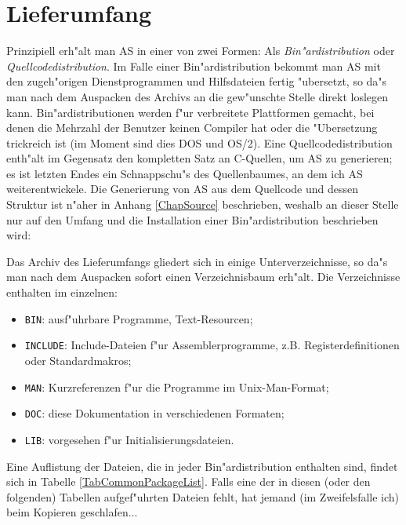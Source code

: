 \documentclass[12pt,a4paper,twoside]{report}
\begin{document}

\section{Lieferumfang}

Prinzipiell erh"alt man AS in einer von zwei Formen: Als {\em
Bin"ardistribution} oder {\em Quellcodedistribution}.  Im Falle einer
Bin"ardistribution bekommt man AS mit den zugeh"origen Dienstprogrammen
und Hilfsdateien fertig "ubersetzt, so da"s man nach dem Auspacken des
Archivs an die gew"unschte Stelle direkt loslegen kann.
Bin"ardistributionen werden f"ur verbreitete Plattformen gemacht, bei
denen die Mehrzahl der Benutzer keinen Compiler hat oder die "Ubersetzung
trickreich ist (im Moment sind dies DOS und OS/2).  Eine
Quellcodedistribution enth"alt im Gegensatz den kompletten Satz an
C-Quellen, um AS zu generieren; es ist letzten Endes ein Schnappschu"s
des Quellenbaumes, an dem ich AS weiterentwickele.  Die Generierung von AS
aus dem Quellcode und dessen Struktur ist n"aher in Anhang
\ref{ChapSource} beschrieben, weshalb an dieser Stelle nur auf den
Umfang und die Installation einer Bin"ardistribution beschrieben wird:

Das Archiv des Lieferumfangs gliedert sich in einige Unterverzeichnisse,
so da"s man nach dem Auspacken sofort einen Verzeichnisbaum erh"alt.  Die
Verzeichnisse enthalten im einzelnen:
\begin{itemize}
\item{{\tt BIN}: ausf"uhrbare Programme, Text-Resourcen;}
\item{{\tt INCLUDE}: Include-Dateien f"ur Assemblerprogramme, z.B.
      Registerdefinitionen oder Standardmakros;}
\item{{\tt MAN}: Kurzreferenzen f"ur die Programme im Unix-Man-Format;}
\item{{\tt DOC}: diese Dokumentation in verschiedenen Formaten;}
\item{{\tt LIB}: vorgesehen f"ur Initialisierungsdateien.}
\end{itemize}
Eine Auflistung der Dateien, die in jeder Bin"ardistribution enthalten
sind, findet sich in Tabelle \ref{TabCommonPackageList}.  Falls eine der
in diesen (oder den folgenden) Tabellen aufgef"uhrten Dateien fehlt, hat
jemand (im Zweifelsfalle ich) beim Kopieren geschlafen...
\end{document}
